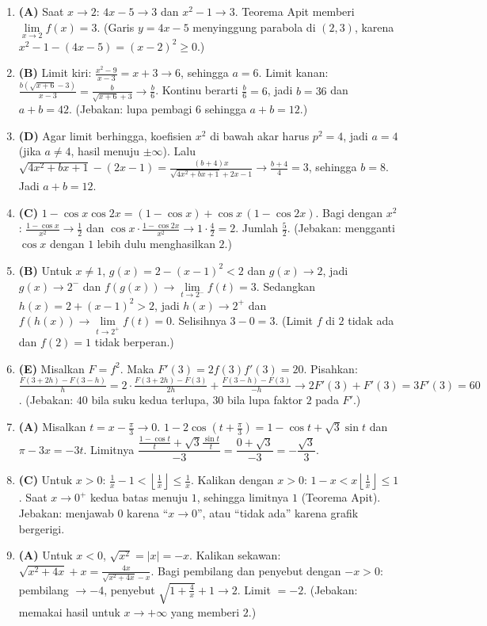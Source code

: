 \documentclass[a4paper,11pt]{article}
\begin{document}
\begin{enumerate}[leftmargin=2em,itemsep=2pt,topsep=2pt]
\item[\textbf{10.}] \textbf{(A)} Saat $x\to2$: $4x-5\to3$ dan $x^2-1\to3$. Teorema Apit memberi $\lim\limits_{x\to2}f(x)=3$. (Garis $y=4x-5$ menyinggung parabola di $(2,3)$, karena $x^2-1-(4x-5)=(x-2)^2\ge0$.)
\item[\textbf{11.}] \textbf{(B)} Limit kiri: $\frac{x^2-9}{x-3}=x+3\to6$, sehingga $a=6$. Limit kanan: $\frac{b(\sqrt{x+6}-3)}{x-3}=\frac{b}{\sqrt{x+6}+3}\to\frac b6$. Kontinu berarti $\frac b6=6$, jadi $b=36$ dan $a+b=42$. (Jebakan: lupa pembagi $6$ sehingga $a+b=12$.)
\item[\textbf{12.}] \textbf{(D)} Agar limit berhingga, koefisien $x^2$ di bawah akar harus $p^2=4$, jadi $a=4$ (jika $a\ne4$, hasil menuju $\pm\infty$). Lalu $\sqrt{4x^2+bx+1}-(2x-1)=\frac{(b+4)x}{\sqrt{4x^2+bx+1}+2x-1}\to\frac{b+4}4=3$, sehingga $b=8$. Jadi $a+b=12$.
\item[\textbf{13.}] \textbf{(C)} $1-\cos x\cos2x=(1-\cos x)+\cos x\,(1-\cos2x)$. Bagi dengan $x^2$: $\frac{1-\cos x}{x^2}\to\frac12$ dan $\cos x\cdot\frac{1-\cos2x}{x^2}\to1\cdot\frac42=2$. Jumlah $\frac52$. (Jebakan: mengganti $\cos x$ dengan $1$ lebih dulu menghasilkan $2$.)
\item[\textbf{14.}] \textbf{(B)} Untuk $x\ne1$, $g(x)=2-(x-1)^2<2$ dan $g(x)\to2$, jadi $g(x)\to2^-$ dan $f(g(x))\to\lim\limits_{t\to2^-}f(t)=3$. Sedangkan $h(x)=2+(x-1)^2>2$, jadi $h(x)\to2^+$ dan $f(h(x))\to\lim\limits_{t\to2^+}f(t)=0$. Selisihnya $3-0=3$. (Limit $f$ di $2$ tidak ada dan $f(2)=1$ tidak berperan.)
\item[\textbf{15.}] \textbf{(E)} Misalkan $F=f^2$. Maka $F'(3)=2f(3)f'(3)=20$. Pisahkan: $\frac{F(3+2h)-F(3-h)}{h}=2\cdot\frac{F(3+2h)-F(3)}{2h}+\frac{F(3-h)-F(3)}{-h}\to2F'(3)+F'(3)=3F'(3)=60$. (Jebakan: $40$ bila suku kedua terlupa, $30$ bila lupa faktor $2$ pada $F'$.)
\item[\textbf{16.}] \textbf{(A)} Misalkan $t=x-\frac\pi3\to0$. $1-2\cos\left(t+\frac\pi3\right)=1-\cos t+\sqrt3\sin t$ dan $\pi-3x=-3t$. Limitnya $\dfrac{\frac{1-\cos t}{t}+\sqrt3\frac{\sin t}{t}}{-3}=\dfrac{0+\sqrt3}{-3}=-\dfrac{\sqrt3}{3}$.
\item[\textbf{17.}] \textbf{(C)} Untuk $x>0$: $\frac1x-1<\left\lfloor\frac1x\right\rfloor\le\frac1x$. Kalikan dengan $x>0$: $1-x<x\left\lfloor\frac1x\right\rfloor\le1$. Saat $x\to0^+$ kedua batas menuju $1$, sehingga limitnya $1$ (Teorema Apit). Jebakan: menjawab $0$ karena ``$x\to0$'', atau ``tidak ada'' karena grafik bergerigi.
\item[\textbf{18.}] \textbf{(A)} Untuk $x<0$, $\sqrt{x^2}=|x|=-x$. Kalikan sekawan: $\sqrt{x^2+4x}+x=\frac{4x}{\sqrt{x^2+4x}-x}$. Bagi pembilang dan penyebut dengan $-x>0$: pembilang $\to-4$, penyebut $\sqrt{1+\frac4x}+1\to2$. Limit $=-2$. (Jebakan: memakai hasil untuk $x\to+\infty$ yang memberi $2$.)

\end{enumerate}
\end{document}

